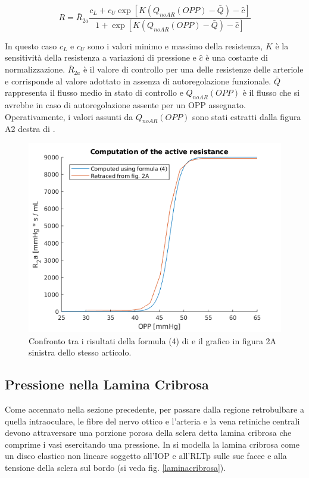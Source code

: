 \documentclass{article}
\begin{document}
\begin{equation}
R = \bar{R}_{2a} \frac{c_L + c_U \exp \left[ K \left(Q_{noAR}(OPP) - \bar{Q}\right) - \hat{c}\right]}{1 + \exp \left[ K \left(Q_{noAR}(OPP) - \bar{Q}\right) - \hat{c}\right]}
\label{activeR}
\end{equation}

In questo caso $c_L$ e $c_U$ sono i valori minimo e massimo della resistenza, $K$ è la sensitività della resistenza a variazioni di pressione e $\hat{c}$ è una costante di normalizzazione.
$\bar{R}_{2a}$ è il valore di controllo per una delle resistenze delle arteriole e corrisponde al valore adottato in assenza di autoregolazione funzionale.
$\bar{Q}$ rappresenta il flusso medio in stato di controllo e $Q_{noAR}(OPP)$ è il flusso che si avrebbe in caso di autoregolazione assente per un OPP assegnato.
Operativamente, i valori assunti da $Q_{noAR}(OPP)$ sono stati estratti dalla figura A2 destra di \cite{art1}.

\begin{figure}[h]
\begin{center}
\includegraphics[width=1.0\textwidth]{Pictures/compare_R2a.png}
\caption{Confronto tra i risultati della formula (4) di \cite{art1} e il grafico in figura 2A sinistra dello stesso articolo.}
\label{compare_active}
\end{center}
\end{figure}

\subsection{Pressione nella Lamina Cribrosa}
\label{sez_lamcri}
Come accennato nella sezione precedente, per passare dalla regione retrobulbare a quella intraoculare, le fibre del nervo ottico e l'arteria e la vena retiniche centrali devono attraversare una porzione porosa della sclera detta lamina cribrosa che comprime i vasi esercitando una pressione.
In \cite{art3} si modella la lamina cribrosa come un disco elastico non lineare soggetto all'IOP e all'RLTp sulle sue facce e alla tensione della sclera sul bordo (si veda fig. \ref{laminacribrosa}).
\end{document}
